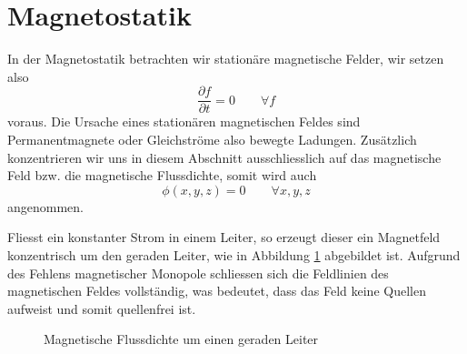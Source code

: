%
%
%
%
\section{Magnetostatik\label{maxwell:magnetostatik}}



In der Magnetostatik betrachten wir stationäre magnetische Felder, wir setzen also  
\[ 
\frac{\partial f}{\partial t}
=
0
\qquad
\forall
f
 \]
voraus. 
Die Ursache eines stationären magnetischen Feldes sind Permanentmagnete oder Gleichströme also bewegte Ladungen.
Zusätzlich konzentrieren wir uns in diesem Abschnitt ausschliesslich auf das magnetische Feld bzw. die magnetische Flussdichte, somit wird auch 
\[\phi(x,y,z) = 0 \qquad \forall x,y,z\] 
angenommen.

Fliesst ein konstanter Strom in einem Leiter, so erzeugt dieser ein Magnetfeld konzentrisch um den geraden Leiter, wie in Abbildung \ref{maxwell:flussdichte} abgebildet ist.
Aufgrund des Fehlens magnetischer Monopole schliessen sich die Feldlinien des magnetischen Feldes vollständig, was bedeutet, dass das Feld keine Quellen aufweist und somit quellenfrei ist.

\begin{figure}
\centering
	\caption{Magnetische Flussdichte um einen geraden Leiter}
	\label{maxwell:flussdichte}
\end{figure}




